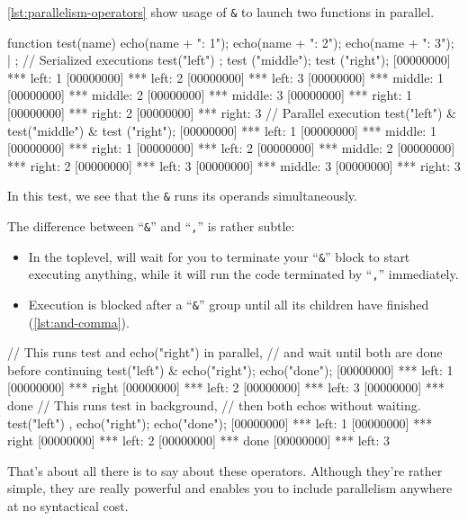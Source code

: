 \autoref{lst:parallelism-operators} show usage of \texttt{\&} to launch two
functions in parallel.

\begin{urbiscript}[caption=Parallelism operator,
  label=lst:parallelism-operators, name=parallel]
function test(name)
{
  echo(name + ": 1");
  echo(name + ": 2");
  echo(name + ": 3");
} | {};
// Serialized executions
test("left") ; test ("middle"); test ("right");
[00000000] *** left: 1
[00000000] *** left: 2
[00000000] *** left: 3
[00000000] *** middle: 1
[00000000] *** middle: 2
[00000000] *** middle: 3
[00000000] *** right: 1
[00000000] *** right: 2
[00000000] *** right: 3
// Parallel execution
test("left") & test("middle") & test ("right");
[00000000] *** left: 1
[00000000] *** middle: 1
[00000000] *** right: 1
[00000000] *** left: 2
[00000000] *** middle: 2
[00000000] *** right: 2
[00000000] *** left: 3
[00000000] *** middle: 3
[00000000] *** right: 3
\end{urbiscript}

In this test, we see that the \texttt{\&} runs its operands
simultaneously.

The difference between ``\texttt{\&}'' and ``\texttt{,}'' is rather
subtle:

\begin{itemize}
\item In the toplevel, will wait for you to terminate your
  ``\texttt{\&}'' block to start executing anything, while it will run
  the code terminated by ``\texttt{,}'' immediately.
\item Execution is blocked after a ``\texttt{\&}'' group until all its
  children have finished (\autoref{lst:and-comma}).
\end{itemize}

\begin{urbiscript}[caption=Difference between ``\texttt{\&}'' and
``\texttt{,}'', label=lst:and-comma, name=parallel]
// This runs test and echo("right") in parallel,
// and wait until both are done before continuing
test("left") & echo("right"); echo("done");
[00000000] *** left: 1
[00000000] *** right
[00000000] *** left: 2
[00000000] *** left: 3
[00000000] *** done
// This runs test in background,
// then both echos without waiting.
test("left") , echo("right"); echo("done");
[00000000] *** left: 1
[00000000] *** right
[00000000] *** left: 2
[00000000] *** done
[00000000] *** left: 3
\end{urbiscript}

That's about all there is to say about these operators. Although
they're rather simple, they are really powerful and enables you to
include parallelism anywhere at no syntactical cost.


